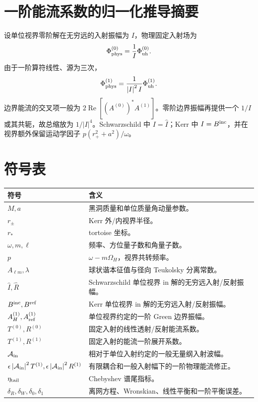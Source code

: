 \documentclass[UTF8,a4paper,11pt]{ctexart}
\newcommand{\Bin}{B^{\rm inc}}
\newcommand{\Bref}{B^{\rm ref}}
\newcommand{\abs}[1]{\left|#1\right|}
\newcommand{\Ree}{\operatorname{Re}}
\begin{document}
\section{一阶能流系数的归一化推导摘要}

设单位视界零阶解在无穷远的入射振幅为 $I$，物理固定入射场为
\begin{equation}
\Phi_{\rm phys}^{(0)}=\frac{1}{I}\Phi_{\rm uh}^{(0)}.
\end{equation}
由于一阶算符线性、源为三次，
\begin{equation}
\Phi_{\rm phys}^{(1)}
=\frac{1}{\abs I^2I}\Phi_{\rm uh}^{(1)}.
\end{equation}
边界能流的交叉项一般为 $2\Ree[(A^{(0)})^*A^{(1)}]$。零阶边界振幅再提供一个 $1/I$ 或其共轭，故总缩放为 $1/\abs I^4$。Schwarzschild 中 $I=\widehat I$；Kerr 中 $I=\Bin$，并在视界额外保留运动学因子 $p(r_+^2+a^2)/\omega$。

\section{符号表}

\footnotesize
\begin{longtable}{p{}p{}}
\toprule
符号 & 含义 \\
\midrule
$M,a$ & 黑洞质量和单位质量角动量参数。\\
$r_\pm$ & Kerr 外/内视界半径。\\
$r_*$ & tortoise 坐标。\\
$\omega,m,\ell$ & 频率、方位量子数和角量子数。\\
$p$ & $\omega-m\Omega_H$，视界共转频率。\\
$A_{\ell m},\lambda$ & 球状谐本征值与径向 Teukolsky 分离常数。\\
$\widehat I,\widehat R$ & Schwarzschild 单位视界 in 解的无穷远入射/反射振幅。\\
$\Bin,\Bref$ & Kerr 单位视界 in 解的无穷远入射/反射振幅。\\
$A_H^{(1)},A_{\rm ref}^{(1)}$ & 单位视界约定的一阶 Green 边界振幅。\\
$T^{(0)},R^{(0)}$ & 固定入射的线性透射/反射能流系数。\\
$T^{(1)},R^{(1)}$ & 固定入射的能流一阶展开系数。\\
$\mathcal A_{\rm in}$ & 相对于单位入射约定的一般无量纲入射波幅。\\
$\epsilon\abs{\mathcal A_{\rm in}}^2T^{(1)},\epsilon\abs{\mathcal A_{\rm in}}^2R^{(1)}$ & 有限耦合和一般入射幅下的一阶物理能流修正。\\
$\eta_{\rm tail}$ & Chebyshev 谱尾指标。\\
$\delta_R,\delta_W,\delta_0,\delta_1$ & 离网方程、Wronskian、线性平衡和一阶平衡误差。\\
\bottomrule
\end{longtable}
\normalsize
\end{document}
